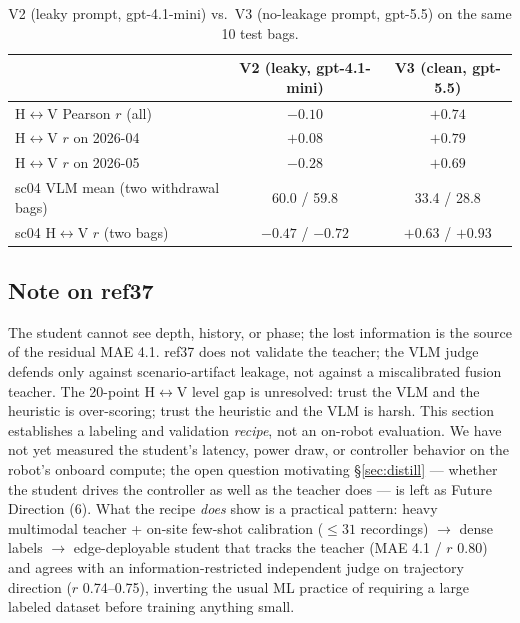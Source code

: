 \documentclass{article}
\begin{document}
\begin{table}[h]
\centering
\caption{V2 (leaky prompt, gpt-4.1-mini) vs.\ V3 (no-leakage prompt, gpt-5.5) on the same 10 test bags.}
\label{tab:v2v3}
\small
\begin{tabular}{@{}lcc@{}}
\toprule
 & V2 (leaky, gpt-4.1-mini) & V3 (clean, gpt-5.5) \\
\midrule
H$\leftrightarrow$V Pearson $r$ (all)           & $-0.10$ & $\mathbf{+0.74}$ \\
H$\leftrightarrow$V $r$ on 2026-04              & $+0.08$ & $+0.79$ \\
H$\leftrightarrow$V $r$ on 2026-05              & $-0.28$ & $+0.69$ \\
sc04 VLM mean (two withdrawal bags)             & 60.0 / 59.8 & 33.4 / 28.8 \\
sc04 H$\leftrightarrow$V $r$ (two bags)         & $-0.47$ / $-0.72$ & $+0.63$ / $+0.93$ \\
\bottomrule
\end{tabular}
\end{table}

\subsection{Note on ref37}

The student cannot see depth, history, or phase; the lost information is the source of the residual MAE 4.1. ref37 does not validate the teacher; the VLM judge defends only against scenario-artifact leakage, not against a miscalibrated fusion teacher. The 20-point H$\leftrightarrow$V level gap is unresolved: trust the VLM and the heuristic is over-scoring; trust the heuristic and the VLM is harsh. This section establishes a labeling and validation \emph{recipe}, not an on-robot evaluation. We have not yet measured the student's latency, power draw, or controller behavior on the robot's onboard compute; the open question motivating \S\ref{sec:distill} --- whether the student drives the controller as well as the teacher does --- is left as Future Direction (6). What the recipe \emph{does} show is a practical pattern: heavy multimodal teacher + on-site few-shot calibration ($\le 31$ recordings) $\to$ dense labels $\to$ edge-deployable student that tracks the teacher (MAE 4.1 / $r$ 0.80) and agrees with an information-restricted independent judge on trajectory direction ($r$ 0.74--0.75), inverting the usual ML practice of requiring a large labeled dataset before training anything small.

\end{document}
